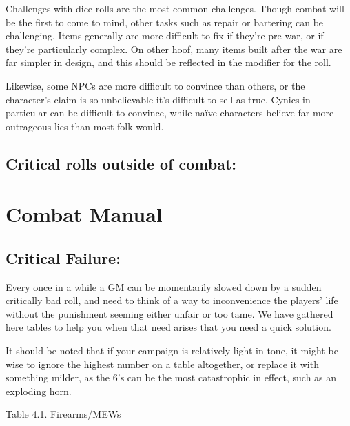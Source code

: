 \documentclass[11pt,a4paper,twocolumn]{book}
\begin{document}
    Challenges with dice rolls are the most common challenges. Though combat will be the first to come to mind, other tasks such as repair or bartering can be challenging. Items generally are more difficult to fix if they're pre-war, or if they're particularly complex. On other hoof, many items built after the war are far simpler in design, and this should be reflected in the modifier for the roll.
    
    Likewise, some NPCs are more difficult to convince than others, or the character's claim is so unbelievable it's difficult to sell as true. Cynics in particular can be difficult to convince, while naïve characters believe far more outrageous lies than most folk would.
    
    
    
    \section*{Critical rolls outside of combat:}
    	
    \chapter{Combat Manual}

    \section*{Critical Failure:}
    Every once in a while a GM can be momentarily slowed down by a sudden critically bad roll, and need to think of a way to inconvenience the players' life without the punishment seeming either unfair or too tame. We have gathered here tables to help you when that need arises that you need a quick solution.
    
    It should be noted that if your campaign is relatively light in tone, it might be wise to ignore the highest number on a table altogether, or replace it with something milder, as the 6's can be the most catastrophic in effect, such as an exploding horn.
    
    Table 4.1. Firearms/MEWs
    
\end{document}
